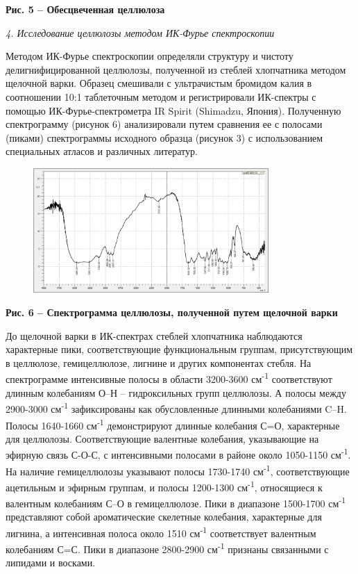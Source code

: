 {\bfseries Рис. 5 -- Обесцвеченная целлюлоза}

\emph{4. Исследование целлюлозы методом ИК-Фурье спектроскопии}

Методом ИК-Фурье спектроскопии определяли структуру и чистоту
делигнифицированной целлюлозы, полученной из стеблей хлопчатника методом
щелочной варки. Образец смешивали с ультрачистым бромидом калия в
соотношении 10:1 таблеточным методом и регистрировали ИК-спектры с
помощью ИК-Фурье-спектрометра IR Spirit (Shimadzu, Япония). Полученную
спектрограмму (рисунок 6) анализировали путем сравнения ее с полосами
(пиками) спектрограммы исходного образца (рисунок 3) с использованием
специальных атласов и различных литератур.

\begin{figure}[H]
	\centering
	\includegraphics[width=0.8\textwidth]{assets/81}
	\caption*{}
\end{figure}

{\bfseries Рис. 6 -- Спектрограмма целлюлозы, полученной путем щелочной
варки}

До щелочной варки в ИК-спектрах стеблей хлопчатника наблюдаются
характерные пики, соответствующие функциональным группам, присутствующим
в целлюлозе, гемицеллюлозе, лигнине и других компонентах стебля. На
спектрограмме интенсивные полосы в области 3200-3600
см\textsuperscript{-1} соответствуют длинным колебаниям О--Н --
гидроксильных групп целлюлозы. А полосы между 2900-3000
см\textsuperscript{-1} зафиксированы как обусловленные длинными
колебаниями C--H. Полосы 1640-1660 см\textsuperscript{-1} демонстрируют
длинные колебания С=О, характерные для целлюлозы. Соответствующие
валентные колебания, указывающие на эфирную связь С-О-С, с интенсивными
полосами в районе около 1050-1150 см\textsuperscript{-1}. На наличие
гемицеллюлозы указывают полосы 1730-1740 см\textsuperscript{-1},
соответствующие ацетильным и эфирным группам, и полосы 1200-1300
см\textsuperscript{-1}, относящиеся к валентным колебаниям С--О в
гемицеллюлозе. Пики в диапазоне 1500-1700 см\textsuperscript{-1}
представляют собой ароматические скелетные колебания, характерные для
лигнина, а интенсивная полоса около 1510 см\textsuperscript{-1}
соответствует валентным колебаниям С=С. Пики в диапазоне 2800-2900
см\textsuperscript{-1} признаны связанными с липидами и восками.

